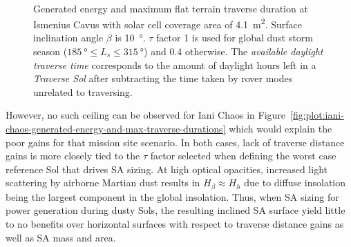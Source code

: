 \documentclass[twocolumn,letterpaper]{IEEEAerospaceCLS}  %
\newcommand{\refFig}[1]{{Figure}~\ref{#1}} %
\newlength{\subfigureWidth}
\begin{document}
\begin{figure}[h]
\begin{subfigure}[t]{\subfigureWidth}
    \label{fig:plot:sub:ismenius-cavus-max-traverse-durations}
  \end{subfigure}\\[0.8ex]
  \caption{Generated energy and maximum flat terrain traverse duration at Ismenius Cavus with solar cell coverage area of \SI{4.1}{m^{2}}. Surface inclination angle $\beta$ is \SI{10}{\degree}. $\tau$ factor 1 is used for global dust storm season ($\SI{185}{\degree} \leq L_{s} \leq \SI{315}{\degree}$) and 0.4 otherwise. The \textit{available daylight traverse time} corresponds to the amount of daylight hours left in a \textit{Traverse Sol} after subtracting the time taken by rover modes unrelated to traversing.}
  \label{fig:plot:ismenius-cavus-generated-energy-and-max-traverse-durations}
\end{figure}

However, no such ceiling can be observed for Iani Chaos in \refFig{fig:plot:iani-chaos-generated-energy-and-max-traverse-durations} which would explain the poor gains for that mission site scenario. In both cases, lack of traverse distance gains is more closely tied to the $\tau$ factor selected when defining the worst case reference Sol that drives \ac{SA} sizing. At high optical opacities, increased light scattering by airborne Martian dust results in $H_{\beta} \approx H_{h}$ due to diffuse insolation being the largest component in the global insolation. Thus, when \ac{SA} sizing for power generation during dusty Sols, the resulting inclined \ac{SA} surface yield little to no benefits over horizontal surfaces with respect to traverse distance gains as well as \ac{SA} mass and area.
\end{document}
